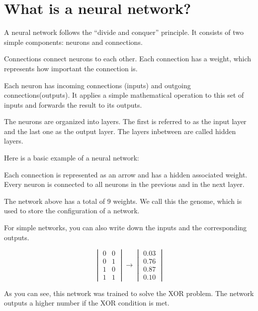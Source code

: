 \newpage
\section{What is a neural network?}

A neural network follows the “divide and conquer” principle. It consists of two simple components: neurons and connections.

Connections connect neurons to each other. Each connection has a weight, which represents how important the connection is.

Each neuron has incoming connections (inputs) and outgoing connections(outputs). It applies a simple mathematical operation to this set of inputs and forwards the result to its outputs.


The neurons are organized into layers. The first is referred to as the input layer and the last one as the output layer. The layers inbetween are called hidden layers.

Here is a basic example of a neural network:

{\centering
	\begin{neuralnetwork}[height=3, nodespacing=1.5cm]
		\newcommand{\nodelabel}[2]{
			\ifnum#1=0 $x_#2$ \fi
			\ifnum#1=1 $y_#2$ \fi
			\ifnum#1=2 $z_#2$ \fi
		}
		\setdefaultnodetext{\nodelabel}
		\hiddenlayer[count=3, bias=false, title=Hidden] \linklayers
		\outputlayer[count=1, title=Output] \linklayers
	\end{neuralnetwork}
\par}

Each connection is represented as an arrow and has a hidden associated weight. Every neuron is connected to all neurons in the previous and in the next layer.

The network above has a total of 9 weights. We call this the genome, which is used to store the configuration of a network.

For simple networks, you can also write down the inputs and the corresponding outputs.

\[
	\begin{vmatrix} 0 & 0 \\ 0 & 1 \\ 1 & 0 \\ 1 & 1 \end{vmatrix}
	\rightarrow
	\begin{vmatrix} 0.03 \\ 0.76 \\ 0.87 \\ 0.10 \end{vmatrix}	
\]

As you can see, this network was trained to solve the XOR problem. The network outputs a higher number if the XOR condition is met.

